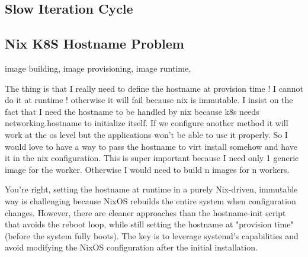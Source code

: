 \subsection{Slow Iteration Cycle}


\subsection{Nix K8S Hostname Problem}

image building, image provisioning, image runtime,

The thing is that I really need to define the hostname at provision time ! I cannot do it at runtime ! otherwise it will fail because nix is immutable. I insist on the fact that I need the hostname to be handled by nix because k8s needs networking.hostname to initialize itself.  If we configure another method it will work at the os level but the applications won't be able to use it properly. So I would love to have a way to pass the hostname to virt install somehow and have it in the nix configuration. This is super important because I need only 1 generic image for the worker. Otherwise I would need to build n images for n workers.

You're right, setting the hostname at runtime in a purely Nix-driven, immutable way is challenging because NixOS rebuilds the entire system when configuration changes.  However, there are cleaner approaches than the hostname-init script that avoids the reboot loop, while still setting the hostname at "provision time" (before the system fully boots).  The key is to leverage systemd's capabilities and avoid modifying the NixOS configuration after the initial installation.

